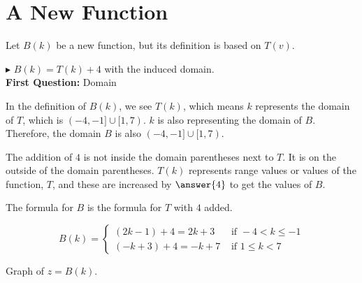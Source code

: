 \documentclass{ximera}
\begin{document}
\section{A New Function}

Let $B(k)$ be a new function, but its definition is based on $T(v)$.


$\blacktriangleright$ $B(k) = T(k)+4$ with the induced domain. \\


\textbf{\textcolor{purple!85!blue}{First Question:}} Domain

In the definition of $B(k)$, we see $T(k)$, which means $k$ represents the domain of $T$, which is $(-4,-1] \cup [1,7)$. $k$ is also representing the domain of $B$.  Therefore, the domain $B$ is also $(-4,-1] \cup [1,7)$.


The addition of $4$ is not inside the domain parentheses next to $T$.  It is on the outside of the domain parentheses. $T(k)$ represents range values or values of the function, $T$, and these are increased by $\answer{4}$ to get the values of $B$.





The formula for $B$ is the formula for $T$ with $4$ added.




\[
B(k) = 
\begin{cases}
  (2k-1)+4 = 2k+3 & \text{ if }  -4 < k \leq -1 \\
  (-k+3)+4 = -k+7 & \text{ if } 1 \leq k < 7
\end{cases}
\]








Graph of $z = B(k)$.
\begin{image}
\end{image}
\end{document}
